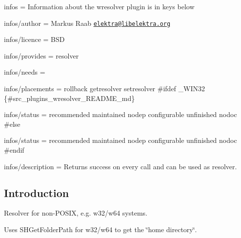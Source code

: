 
\begin{DoxyItemize}
\item infos = Information about the wresolver plugin is in keys below
\item infos/author = Markus Raab \href{mailto:elektra@libelektra.org}{\tt elektra@libelektra.\+org}
\item infos/licence = B\+S\+D
\item infos/provides = resolver
\item infos/needs =
\item infos/placements = rollback getresolver setresolver \#ifdef \+\_\+\+W\+I\+N32 \{\#src\+\_\+plugins\+\_\+wresolver\+\_\+\+R\+E\+A\+D\+M\+E\+\_\+md\}
\item infos/status = recommended maintained nodep configurable unfinished nodoc \#else
\item infos/status = recommended maintained nodep configurable unfinished nodoc \#endif
\item infos/description = Returns success on every call and can be used as resolver.
\end{DoxyItemize}

\subsection*{Introduction}

Resolver for non-\/\+P\+O\+S\+I\+X, e.\+g. w32/w64 systems.

Uses S\+H\+Get\+Folder\+Path for w32/w64 to get the \char`\"{}home directory\char`\"{}. 